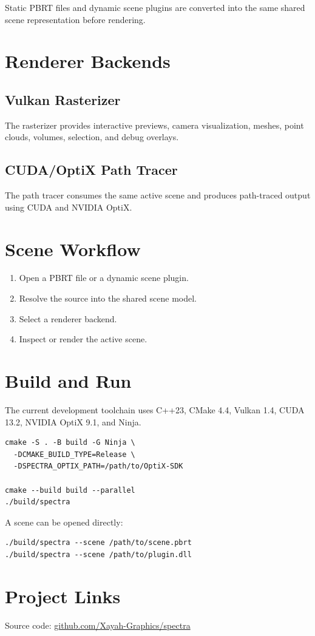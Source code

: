 \documentclass[11pt]{article}
\begin{document}
Static PBRT files and dynamic scene plugins are converted into the
same shared scene representation before rendering.

\section{Renderer Backends}

\subsection{Vulkan Rasterizer}

The rasterizer provides interactive previews, camera visualization,
meshes, point clouds, volumes, selection, and debug overlays.

\subsection{CUDA/OptiX Path Tracer}

The path tracer consumes the same active scene and produces
path-traced output using CUDA and NVIDIA OptiX.

\section{Scene Workflow}

\begin{enumerate}
  \item Open a PBRT file or a dynamic scene plugin.
  \item Resolve the source into the shared scene model.
  \item Select a renderer backend.
  \item Inspect or render the active scene.
\end{enumerate}

\section{Build and Run}

The current development toolchain uses C++23, CMake 4.4,
Vulkan 1.4, CUDA 13.2, NVIDIA OptiX 9.1, and Ninja.

\begin{lstlisting}
cmake -S . -B build -G Ninja \
  -DCMAKE_BUILD_TYPE=Release \
  -DSPECTRA_OPTIX_PATH=/path/to/OptiX-SDK

cmake --build build --parallel
./build/spectra
\end{lstlisting}

A scene can be opened directly:

\begin{lstlisting}
./build/spectra --scene /path/to/scene.pbrt
./build/spectra --scene /path/to/plugin.dll
\end{lstlisting}

\section{Project Links}

Source code:
\href{https://github.com/Xayah-Graphics/spectra}
{github.com/Xayah-Graphics/spectra}
\end{document}
